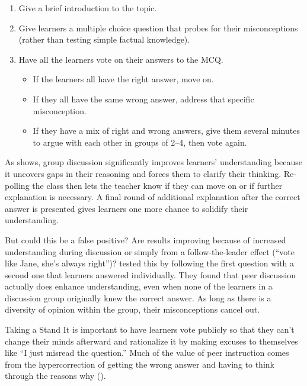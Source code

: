 \begin{enumerate}

\item
  Give a brief introduction to the topic.

\item
  Give learners a multiple choice question that probes for their misconceptions
  (rather than testing simple factual knowledge).

\item
  Have all the learners vote on their answers to the MCQ.

  \begin{itemize}

  \item
    If the learners all have the right answer, move on.

  \item
    If they all have the same wrong answer,
    address that specific misconception.

  \item
    If they have a mix of right and wrong answers,
    give them several minutes to argue with each other in groups of 2--4,
    then vote again.

  \end{itemize}

\end{enumerate}

As
 shows,
group discussion significantly improves learners' understanding
because it uncovers gaps in their reasoning and forces them to clarify their thinking.
Re-polling the class then lets the teacher know if they can move on
or if further explanation is necessary.
A final round of additional explanation after the correct answer is presented
gives learners one more chance to solidify their understanding.

But could this be a false positive?
Are results improving because of increased understanding during discussion
or simply from a follow-the-leader effect (``vote like Jane, she's always right'')?
\cite{Smit2009} tested this by following the first question with a second one
that learners answered individually.
They found that peer discussion actually does enhance understanding,
even when none of the learners in a discussion group originally knew the correct answer.
As long as there is a diversity of opinion within the group,
their misconceptions cancel out.

\newpage
\begin{aside}{Taking a Stand}
  It is important to have learners vote publicly
  so that they can't change their minds afterward and rationalize it
  by making excuses to themselves like ``I just misread the question.''
  Much of the value of peer instruction comes from the hypercorrection
  of getting the wrong answer
  and having to think through the reasons why
  ().
\end{aside}


